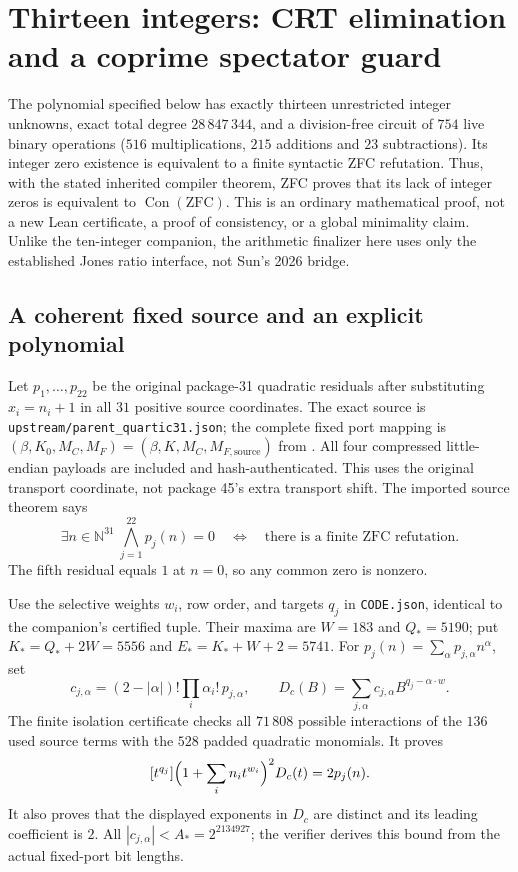 \section{Thirteen integers: CRT elimination and a coprime spectator guard}
\label{sec:jones-seeded}

The polynomial specified below has exactly thirteen unrestricted integer
unknowns, exact total degree $28\,847\,344$, and a division-free circuit of
$754$ live binary operations ($516$ multiplications, $215$ additions and
$23$ subtractions). Its integer zero existence is equivalent to a finite
syntactic ZFC refutation. Thus, with the stated inherited compiler theorem,
ZFC proves that its lack of integer zeros is equivalent to
$\operatorname{Con}(\mathrm{ZFC})$. This is an ordinary mathematical proof,
not a new Lean certificate, a proof of consistency, or a global minimality
claim. Unlike the ten-integer companion, the arithmetic finalizer here uses
only the established Jones ratio interface, not Sun's 2026 bridge.

\subsection{A coherent fixed source and an explicit polynomial}
Let $p_1,\ldots,p_{22}$ be the original package-31 quadratic residuals after
substituting $x_i=n_i+1$ in all $31$ positive source coordinates. The exact
source is \texttt{upstream/parent\_quartic31.json}; the complete fixed port
mapping is $(\beta,K_0,M_C,M_F)=(\beta,K,M_C,M_{F,\mathrm{source}})$ from
. All four compressed little-endian payloads are
included and hash-authenticated. This uses the original transport coordinate,
not package 45's extra transport shift. The imported source theorem says
\[
 \exists n\in\mathbb N^{31}\ \bigwedge_{j=1}^{22}p_j(n)=0
 \quad\Longleftrightarrow\quad
 \text{there is a finite ZFC refutation}.
\]
The fifth residual equals $1$ at $n=0$, so any common zero is nonzero.

Use the selective weights $w_i$, row order, and targets $q_j$ in
\texttt{CODE.json}, identical to the companion's certified tuple.
Their maxima are $W=183$ and $Q_*=5190$; put $K_*=Q_*+2W=5556$ and
$E_*=K_*+W+2=5741$. For
$p_j(n)=\sum_\alpha p_{j,\alpha}n^\alpha$, set
\[
 c_{j,\alpha}=(2-|\alpha|)!\prod_i\alpha_i!\,p_{j,\alpha},\qquad
 D_c(B)=\sum_{j,\alpha}c_{j,\alpha}B^{q_j-\alpha\cdot w}.
\]
The finite isolation certificate checks all $71\,808$ possible interactions
of the $136$ used source terms with the $528$ padded quadratic monomials.
It proves
\[
 [t^{q_j}]\Bigl(1+\sum_i n_it^{w_i}\Bigr)^2D_c(t)=2p_j(n).
\]
It also proves that the displayed exponents in $D_c$ are distinct and its
leading coefficient is $2$. All $|c_{j,\alpha}|<A_*=2^{2134927}$;
the verifier derives this bound from the actual fixed-port bit lengths.


